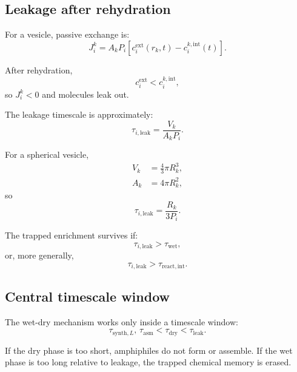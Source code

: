 \documentclass[11pt]{article}
\begin{document}
\subsection{Leakage after rehydration}

For a vesicle, passive exchange is:
\begin{equation}
    J_i^k =
    A_k P_i
    \left[
    c_i^{\mathrm{ext}}(r_k,t)
    -
    c_i^{k,\mathrm{int}}(t)
    \right].
\end{equation}

After rehydration,
\begin{equation}
    c_i^{\mathrm{ext}} < c_i^{k,\mathrm{int}},
\end{equation}
so $J_i^k<0$ and molecules leak out.

The leakage timescale is approximately:
\begin{equation}
    \tau_{i,\mathrm{leak}}
    =
    \frac{V_k}{A_kP_i}.
\end{equation}

For a spherical vesicle,
\begin{align}
    V_k &= \frac{4}{3}\pi R_k^3, \\
    A_k &= 4\pi R_k^2,
\end{align}
so
\begin{equation}
    \tau_{i,\mathrm{leak}}
    =
    \frac{R_k}{3P_i}.
\end{equation}

The trapped enrichment survives if:
\begin{equation}
    \tau_{i,\mathrm{leak}}
    >
    \tau_{\mathrm{wet}},
\end{equation}
or, more generally,
\begin{equation}
    \tau_{i,\mathrm{leak}}
    >
    \tau_{\mathrm{react,int}}.
\end{equation}

\subsection{Central timescale window}

The wet-dry mechanism works only inside a timescale window:
\begin{equation}
    \tau_{\mathrm{synth},L},\,
    \tau_{\mathrm{asm}}
    <
    \tau_{\mathrm{dry}}
    <
    \tau_{\mathrm{leak}}.
\end{equation}

If the dry phase is too short, amphiphiles do not form or assemble. If the wet
phase is too long relative to leakage, the trapped chemical memory is erased.
\end{document}

